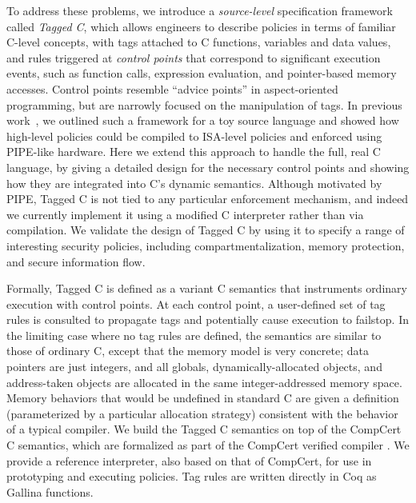 \documentclass{llncs}
\begin{document}
To address these problems, we introduce a \emph{source-level} specification framework called \emph{Tagged C},
which allows engineers to describe policies in terms of familiar C-level concepts, with tags attached to
C functions, variables and data values, and rules triggered at \emph{control points} that correspond to
significant execution events, such as function calls, expression evaluation, and pointer-based memory accesses. 
Control points resemble ``advice points'' in aspect-oriented programming, but are narrowly
focused on the manipulation of tags.
In previous work~\cite{Chhak21:Tagine}, we outlined such a framework for a toy
source language and showed how high-level policies could be compiled to ISA-level policies and 
enforced using PIPE-like hardware.  Here we extend this approach to handle
the full, real C language, by giving a detailed design for the necessary control points and
showing how they are integrated into C's dynamic semantics. 
Although motivated by PIPE, Tagged C is not tied to any particular enforcement mechanism,
and indeed we currently implement it using a modified C interpreter rather than via compilation.
We validate the design of Tagged C by using it to specify a range of interesting security policies,
including compartmentalization, memory protection, and secure information flow.


Formally, Tagged C is defined as a variant C semantics that instruments ordinary execution with control points.
At each control point, a user-defined set of tag rules is consulted to propagate tags and potentially cause
execution to failstop. In the limiting case where no tag rules are defined, the semantics are similar to
those of ordinary C, except that the memory model is very concrete; 
data pointers are just integers, and all globals, dynamically-allocated objects,
and address-taken objects are allocated in the same integer-addressed memory space. Memory behaviors
that would be undefined in standard C are given a definition (parameterized by a particular allocation strategy)
consistent with the behavior of a typical compiler.
We build the Tagged C semantics on top of the CompCert C semantics, which are formalized 
as part of the CompCert verified compiler \cite{Leroy09:CompCert}. We provide a reference interpreter,
also based on that of CompCert, for use in prototyping and executing policies. Tag rules are written directly
in Coq as Gallina functions.
\end{document}
